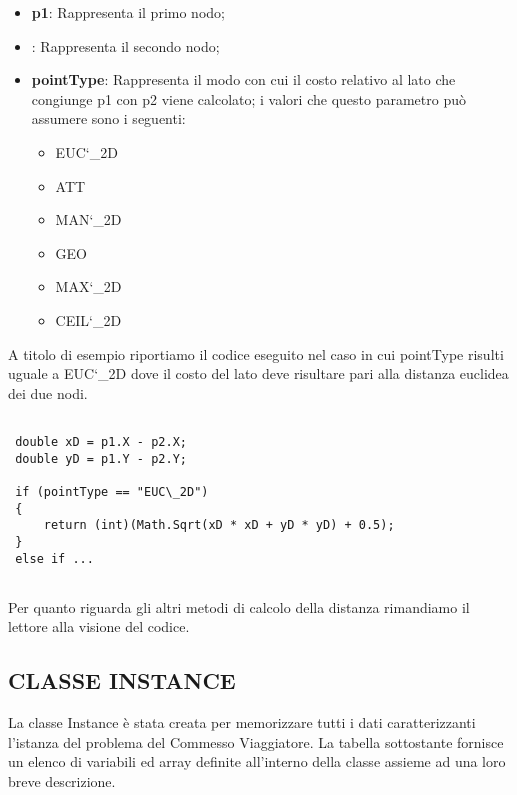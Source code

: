 \documentclass[11pt]{article}
\begin{document}
\begin{itemize}
\item \textbf{p1}: Rappresenta il primo nodo;
\item {}: Rappresenta il secondo nodo;
\item \textbf{pointType}: Rappresenta il modo con cui il costo relativo al lato che congiunge p1 con p2 viene calcolato; i valori che questo parametro può assumere sono i seguenti:
    \begin{itemize}
    \item EUC\char`\_2D
    \item ATT
    \item MAN\char`\_2D
    \item GEO
    \item MAX\char`\_2D    
    \item CEIL\char`\_2D
    \end{itemize}
\end{itemize}

A titolo di esempio riportiamo il codice eseguito nel caso in cui pointType risulti uguale a EUC\char`\_2D dove il costo del lato deve risultare pari alla distanza euclidea dei due nodi. 

\begin{lstlisting}

 double xD = p1.X - p2.X;
 double yD = p1.Y - p2.Y;
 
 if (pointType == "EUC\_2D")
 {
     return (int)(Math.Sqrt(xD * xD + yD * yD) + 0.5);
 }
 else if ...
            
\end{lstlisting}

Per quanto riguarda gli altri metodi di calcolo della distanza rimandiamo il lettore alla visione del codice.

\subsection*{CLASSE INSTANCE}

La classe Instance è stata creata per memorizzare tutti i dati caratterizzanti l'istanza del problema del Commesso Viaggiatore. La tabella sottostante fornisce un elenco di variabili ed array definite all'interno della classe assieme ad una loro breve descrizione. 
\end{document}
